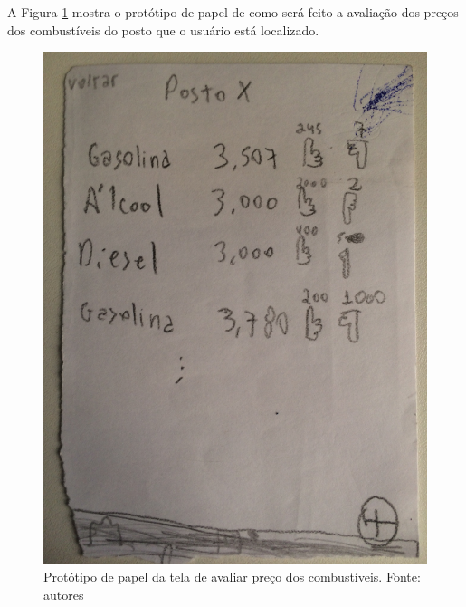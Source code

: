 A Figura \ref{img:prototipo_de_papel_precos_combustiveis} mostra o protótipo de papel de como será feito a avaliação dos preços dos combustíveis do posto que o usuário está localizado.
\begin{figure}[H]
    \centering
    \includegraphics[scale=0.1, angle=-90]{figuras/prototipo_papel_avaliar_precos_postos.jpg}
    \caption[Protótipo de papel da tela de avaliar preço dos combustíveis]{Protótipo de papel da tela de avaliar preço dos combustíveis. Fonte: autores}
    \label{img:prototipo_de_papel_precos_combustiveis}
\end{figure}
 \pagebreak

